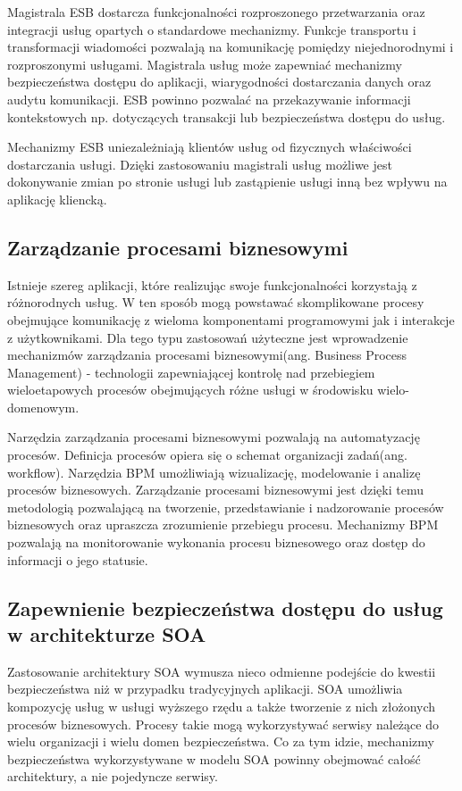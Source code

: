 		Magistrala ESB dostarcza funkcjonalności rozproszonego przetwarzania oraz integracji usług opartych o standardowe mechanizmy. Funkcje transportu i transformacji wiadomości pozwalają na komunikację pomiędzy niejednorodnymi i rozproszonymi usługami. Magistrala usług może zapewniać mechanizmy bezpieczeństwa dostępu do aplikacji, wiarygodności dostarczania danych oraz audytu komunikacji. ESB powinno pozwalać na przekazywanie informacji kontekstowych np. dotyczących transakcji lub bezpieczeństwa dostępu do usług.

		Mechanizmy ESB uniezależniają klientów usług od fizycznych właściwości dostarczania usługi. Dzięki zastosowaniu magistrali usług możliwe jest dokonywanie zmian po stronie usługi lub zastąpienie usługi inną bez wpływu na aplikację kliencką. 

	\subsection{Zarządzanie procesami biznesowymi} 

		Istnieje szereg aplikacji, które realizując swoje funkcjonalności korzystają z różnorodnych usług. W ten sposób mogą powstawać skomplikowane procesy obejmujące komunikację z wieloma komponentami programowymi jak i interakcje z użytkownikami. Dla tego typu zastosowań użyteczne jest wprowadzenie mechanizmów zarządzania procesami biznesowymi(ang. Business Process Management) - technologii zapewniającej kontrolę nad przebiegiem wieloetapowych procesów obejmujących różne usługi w środowisku wielo-domenowym.

		Narzędzia zarządzania procesami biznesowymi pozwalają na automatyzację procesów. Definicja procesów opiera się o schemat organizacji zadań(ang. workflow). Narzędzia BPM umożliwiają wizualizację, modelowanie i analizę procesów biznesowych. Zarządzanie procesami biznesowymi jest dzięki temu metodologią pozwalającą na tworzenie, przedstawianie i nadzorowanie procesów biznesowych oraz upraszcza zrozumienie przebiegu procesu. Mechanizmy BPM pozwalają na monitorowanie wykonania procesu biznesowego oraz dostęp do informacji o jego statusie. 

	\subsection{Zapewnienie bezpieczeństwa dostępu do usług w architekturze SOA}

		Zastosowanie architektury SOA wymusza nieco odmienne podejście do kwestii bezpieczeństwa niż w przypadku tradycyjnych aplikacji. SOA umożliwia kompozycję usług w usługi wyższego rzędu a także tworzenie z nich złożonych procesów biznesowych. Procesy takie mogą wykorzystywać serwisy należące do wielu organizacji i wielu domen bezpieczeństwa. Co za tym idzie, mechanizmy bezpieczeństwa wykorzystywane w modelu SOA powinny obejmować całość architektury, a nie pojedyncze serwisy.
		
